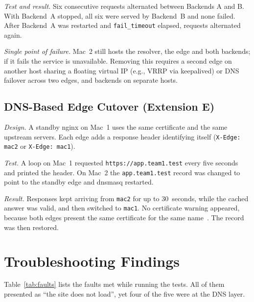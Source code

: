 \documentclass[conference]{IEEEtran}
\newcommand{\cmd}[1]{\texttt{#1}}
\begin{document}
\textit{Test and result.} Six consecutive requests alternated between Backends A and B. With Backend~A stopped, all six were served by Backend~B and none failed. After Backend~A was restarted and \cmd{fail\_timeout} elapsed, requests alternated again.

\textit{Single point of failure.} Mac~2 still hosts the resolver, the edge and both backends; if it fails the service is unavailable. Removing this requires a second edge on another host sharing a floating virtual IP (e.g., VRRP via keepalived) or DNS failover across two edges, and backends on separate hosts.

\subsection{DNS-Based Edge Cutover (Extension E)}
\textit{Design.} A standby nginx on Mac~1 uses the same certificate and the same upstream servers. Each edge adds a response header identifying itself (\cmd{X-Edge: mac2} or \cmd{X-Edge: mac1}).

\textit{Test.} A loop on Mac~1 requested \cmd{https://app.team1.test} every five seconds and printed the header. On Mac~2 the \cmd{app.team1.test} record was changed to point to the standby edge and dnsmasq restarted.

\textit{Result.} Responses kept arriving from \cmd{mac2} for up to 30~seconds, while the cached answer was valid, and then switched to \cmd{mac1}. No certificate warning appeared, because both edges present the same certificate for the same name~\cite{rfc8446}. The record was then restored.

\section{Troubleshooting Findings}\label{sec:trouble}
Table~\ref{tab:faults} lists the faults met while running the tests. All of them presented as ``the site does not load'', yet four of the five were at the DNS layer.
\end{document}
